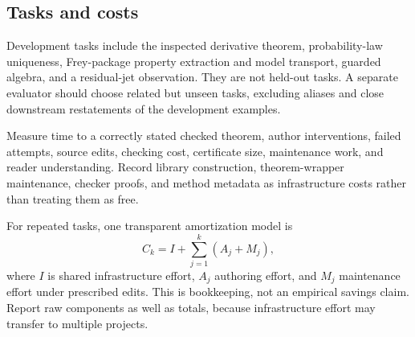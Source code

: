\documentclass[11pt,a4paper]{article}
\theoremstyle{definition}
\begin{document}
\subsection{Tasks and costs}
Development tasks include the inspected derivative theorem, probability-law
uniqueness, Frey-package property extraction and model transport, guarded
algebra, and a residual-jet observation. They are not held-out tasks. A separate
evaluator should choose related but unseen tasks, excluding aliases and close
downstream restatements of the development examples.

Measure time to a correctly stated checked theorem, author interventions,
failed attempts, source edits, checking cost, certificate size, maintenance
work, and reader understanding. Record library construction, theorem-wrapper
maintenance, checker proofs, and method metadata as infrastructure costs rather
than treating them as free.

For repeated tasks, one transparent amortization model is
\[
 C_k=I+\sum_{j=1}^{k}(A_j+M_j),
\]
where $I$ is shared infrastructure effort, $A_j$ authoring effort, and $M_j$
maintenance effort under prescribed edits. This is bookkeeping, not an
empirical savings claim. Report raw components as well as totals, because
infrastructure effort may transfer to multiple projects.
\end{document}
